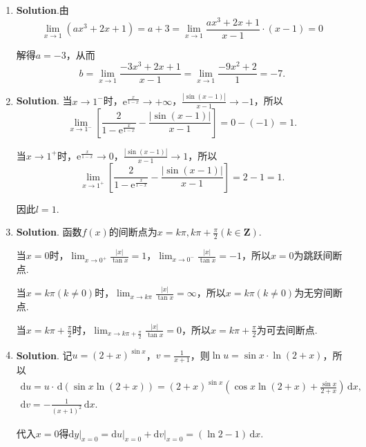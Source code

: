\documentclass[../Main.tex]{subfiles}
\begin{document}
\begin{enumerate}
    \item \textbf{Solution}.由
          \[
              \lim_{x\to1}(ax^{3}+2x+1)=a+3=\lim_{x\to1}\frac{ax^{3}+2x+1}{x-1}\cdot(x-
              1)=0
          \]

          解得$a=-3$，从而
          \[
              b=\lim_{x\to1}\frac{-3x^{3}+2x+1}{x-1}=\lim_{x\to1}\frac{-9x^{2}+2}{1}= -
              7.
          \]

    \item \textbf{Solution}. 当$x\to1^{-}$时，$\mathrm{e}^{\frac{x}{1-x}}\to+\infty$，$\frac{|\sin(x-1)|}{x-1}
              \to-1$，所以
          \[
              \lim_{x\to1^-}\left[\frac{2}{1-\mathrm{e}^{\frac{x}{1-x}}}-\frac{|\sin(x-1)|}{x-1}
                  \right]= 0-(-1)=1.
          \]

          当$x\to1^{+}$时，$\mathrm{e}^{\frac{x}{1-x}}\to0$，$\frac{|\sin(x-1)|}{x-1}
              \to1$，所以
          \[
              \lim_{x\to1^+}\left[\frac{2}{1-\mathrm{e}^{\frac{x}{1-x}}}-\frac{|\sin(x-1)|}{x-1}
                  \right]= 2-1=1.
          \]

          因此$l=1$.

    \item \textbf{Solution}. 函数$f(x)$的间断点为$x=k\pi,k\pi+\frac{\pi}{2}(k\in\mathbf{Z}
              )$.

          当$x=0$时，$\lim_{x\to0^+}\frac{|x|}{\tan x}=1$，$\lim_{x\to0^-}\frac{|x|}{\tan
                  x}=-1$，所以$x=0$为跳跃间断点.

          当$x=k\pi(k\neq0)$时，$\lim_{x\to k\pi}\frac{|x|}{\tan x}=\infty$，所以$x=k
              \pi(k\neq0)$为无穷间断点.

          当$x=k\pi+\frac{\pi}{2}$时，$\lim_{x\to k\pi+\frac{\pi}{2}}\frac{|x|}{\tan
                  x}=0$，所以$x=k\pi+\frac{\pi}{2}$为可去间断点.

    \item \textbf{Solution}. 记$u=(2+x)^{\sin x}$，$v=\frac{1}{x+1}$，则$\ln u = \sin
              x\cdot\ln(2+x)$，所以
          \[
              \begin{gathered}
                  \mathrm{d}u =u\cdot\,\mathrm{d}\left(\sin x\ln(2+x)\right)=(2+x)^{\sin x}\left(\cos
                  x\ln(2+x)+\frac{\sin x}{2+x}\right)\,\mathrm{d}x,\\
                  \mathrm{d}v =-\frac{1}{(x+1)^{2}}\,\mathrm{d}x.
              \end{gathered}
          \]

          代入$x=0$得$\left.\mathrm{d}y\right|_{x=0}=\left.\mathrm{d}u\right|_{x=0}+\left
              .\mathrm{d}v\right|_{x=0}=(\ln2-1)\,\mathrm{d}x$.


\end{enumerate}
\end{document}
